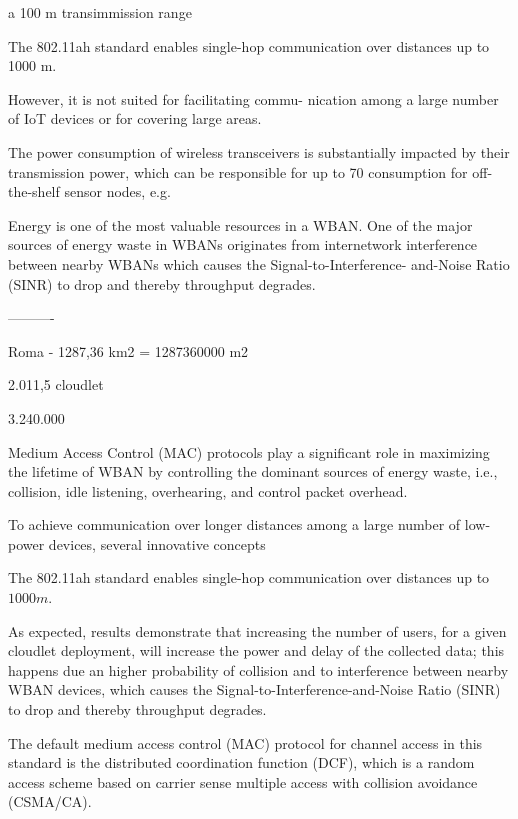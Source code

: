 \documentclass[sigchi]{acmart}
\begin{document}
a 100 m transimmission range







The 802.11ah standard enables single-hop communication over distances up to 1000 m.



However, it is not suited for facilitating commu-
nication among a large number of IoT devices or for covering
large areas.











The power consumption of wireless transceivers is 
substantially impacted by their transmission power, which 
can be responsible for up to 70%
consumption for off-the-shelf sensor nodes, e.g.

Energy is one of the most valuable resources in a 
WBAN. One of the major sources of energy waste in 
WBANs originates from internetwork interference between 
nearby WBANs which causes the Signal-to-Interference-
and-Noise Ratio (SINR) to drop and thereby throughput 
degrades.


----------

Roma - 1287,36 km2 = 1287360000 m2

2.011,5 cloudlet  


3.240.000




Medium Access
Control (MAC) protocols play a signiﬁcant role in maximizing
the lifetime of WBAN by controlling the dominant sources
of energy waste, i.e., collision, idle listening, overhearing,
and control packet overhead.

To achieve communication over longer distances among a large number of low-power devices, several innovative concepts 

The 802.11ah standard enables single-hop communication over distances up to $1000 m$.


As expected, \citet{MSAReport} results demonstrate that increasing the number of users, for a given cloudlet deployment, will increase the power and delay of the collected data; this happens due an higher probability of collision and to interference between nearby WBAN devices, which causes the Signal-to-Interference-and-Noise Ratio (SINR) to drop and thereby throughput degrades.


 The
default medium access control (MAC) protocol for channel access in this standard is the distributed coordination
function (DCF), which is a random access scheme based
on carrier sense multiple access with collision avoidance
(CSMA/CA).
\end{document}
